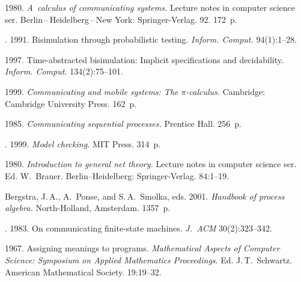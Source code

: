 


  \begin{multicols}{2}

\renewcommand{\bibname}{\protect\rmfamily References}

{\small\frenchspacing
{%
\begin{thebibliography}{99}

 1980.
\textit{A~calculus of communicating systems.}
{Lecture notes in computer science ser.}
Berlin\,--\,Heidelberg\,--\,New York: Springer-Verlag. 92. 172~p.

.
1991.
Bisimulation through probabilistic testing.
\textit{Inform. Comput.} 94(1):1--28.

1997. Time-abstracted bisimulation:
Implicit specifications and decidability.
\textit{Inform. Comput.} 134(2):75--101.

1999. \textit{Communicating and mobile systems:
The $\pi$-calculus.} Cambridge: Cambridge University Press. 162~p.

1985. \textit{Communicating sequential processes.} Prentice Hall. 256~p.

.
1999. \textit{Model checking.} MIT Press. 314~p.

1980. \textit{Introduction to general net theory.}
{Lecture notes in computer science ser.}
Ed. W.~Brauer. Berlin--Heidelberg:
Springer-Verlag.  84:1--19.

Bergstra, J.\,A., A.~Ponse, and S.\,A.~Smolka, eds.
2001. \textit{Handbook of process algebra.}
North-Holland, Amsterdam. 1357~p.

.
1983. On communicating finite-state machines.
\textit{J.~ACM} 30(2):323--342.

1967. Assigning meanings to programs.
\textit{Mathematical Aspects of Computer Science:
Symposium on Applied Mathematics Proceedings}. Ed. J.\,T.~Schwartz.
American Mathematical Society. 19:19--32.


\end{thebibliography}}}
\end{multicols}
